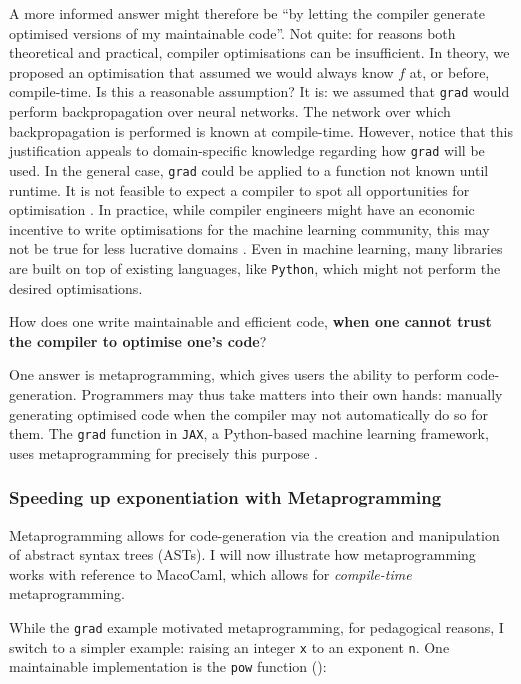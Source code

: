 A more informed answer might therefore be ``by letting the compiler generate optimised versions of my maintainable code''. Not quite: for reasons both theoretical and practical, compiler optimisations can be insufficient. In theory, we proposed an optimisation that assumed we would always know $f$ at, or before, compile-time. Is this a reasonable assumption? It is: we assumed that \texttt{grad} would perform backpropagation over neural networks. The network over which backpropagation is performed is known at compile-time. However, notice that this justification appeals to domain-specific knowledge regarding how \texttt{grad} will be used. In the general case, \texttt{grad} could be applied to a function not known until runtime. It is not feasible to expect a compiler to spot all opportunities for optimisation \citep{rice-53}. In practice, while compiler engineers might have an economic incentive to write optimisations for the machine learning community, this may not be true for less lucrative domains \citep{robinson-01}. Even in machine learning, many libraries are built on top of existing languages, like \texttt{Python}, which might not perform the desired optimisations.

How does one write maintainable and efficient code, \textbf{when one cannot trust the compiler to optimise one's code}?

One answer is metaprogramming, which gives users the ability to perform code-generation. Programmers may thus take matters into their own hands: manually generating optimised code when the compiler may not automatically do so for them. The \texttt{grad} function in \texttt{JAX}, a Python-based machine learning framework, uses metaprogramming for precisely this purpose \citep{jax-grad-metaprogramming}.

\subsubsection{Speeding up exponentiation with Metaprogramming}
Metaprogramming allows for code-generation via the creation and manipulation of abstract syntax trees (ASTs). I will now illustrate how metaprogramming works with reference to MacoCaml, which allows for \textit{compile-time} metaprogramming. 

While the \texttt{grad} example motivated metaprogramming, for pedagogical reasons, I switch to a simpler example: raising an integer \texttt{x} to an exponent \texttt{n}. One maintainable implementation is the \texttt{pow} function ():

